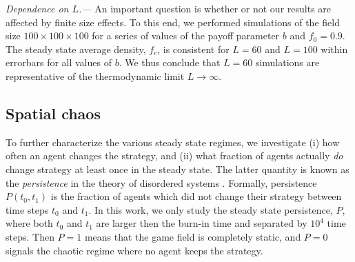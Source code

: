 \documentclass[a4paper]{jpconf}
\begin{document}
\emph{Dependence on $L$.---} An important question is whether or not our results are affected by finite size effects. To this end, we performed simulations of the field size $100\times 100\times 100$ for a series of values of the payoff parameter $b$ and $f_0=0.9$. The steady state average density, $f_c$, is consistent for $L=60$ and $L=100$ within errorbars for all values of $b$. We thus conclude that $L=60$ simulations are representative of the thermodynamic limit $L\to\infty$.

\subsection{Spatial chaos}
\label{subsec:chaos}

To further characterize the various steady state regimes, we investigate (i) how often an agent
changes the strategy, and (ii) what fraction of agents actually \emph{do} change
strategy at least once in the steady state. 
The latter quantity is known as the \emph{persistence} in the theory of disordered systems \cite{Bray1994, Majumdar1999}. Formally, persistence $P(t_0, t_1)$ is the fraction of agents which did not change their strategy between time steps $t_0$ and $t_1$. In this work, we only study the steady state persistence, $P$, where both $t_0$ and $t_1$ are larger then the burn-in time and separated by $10^4$ time steps. Then $P=1$ means that the game field is completely static, and $P=0$ signals the chaotic regime where no agent keeps the strategy. 
\end{document}
